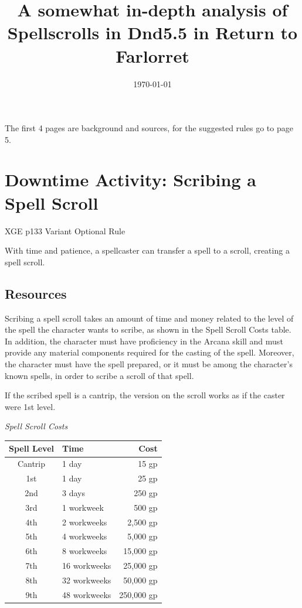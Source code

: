 \documentclass{article}
\title{A somewhat in-depth analysis of Spellscrolls in Dnd5.5 in Return to Farlorret}
\date{\today}
\begin{document}
    \maketitle

    The first 4 pages are background and sources, for the suggested rules go to page 5.

    \section*{Downtime Activity: Scribing a Spell Scroll}
    XGE 
    p133 
    Variant Optional Rule

    With time and patience, a spellcaster can transfer a spell to a scroll, creating a spell scroll.



    \subsection*{Resources}

    Scribing a spell scroll takes an amount of time and money related to the level of the spell the character wants to scribe, as shown in the Spell Scroll Costs table. In addition, the character must have proficiency in the Arcana skill and must provide any material components required for the casting of the spell. Moreover, the character must have the spell prepared, or it must be among the character's known spells, in order to scribe a scroll of that spell.

    If the scribed spell is a cantrip, the version on the scroll works as if the caster were 1st level.

    \large \textit{Spell Scroll Costs} \normalsize

    \begin{tabular}{|clr|}
        \hline
        Spell Level	&Time	&Cost\\
        \hline
        Cantrip	&1 day	&15 gp\\
        \hline
        1st	&1 day	&25 gp\\
        \hline
        2nd	&3 days	&250 gp\\
        \hline
        3rd	&1 workweek	&500 gp\\
        \hline
        4th	&2 workweeks	&2,500 gp\\
        \hline
        5th	&4 workweeks	&5,000 gp\\
        \hline
        6th	&8 workweeks	&15,000 gp\\
        \hline
        7th	&16 workweeks	&25,000 gp\\
        \hline
        8th	&32 workweeks	&50,000 gp\\
        \hline
        9th	&48 workweeks	&250,000 gp\\
        \hline
    \end{tabular}
\end{document}
